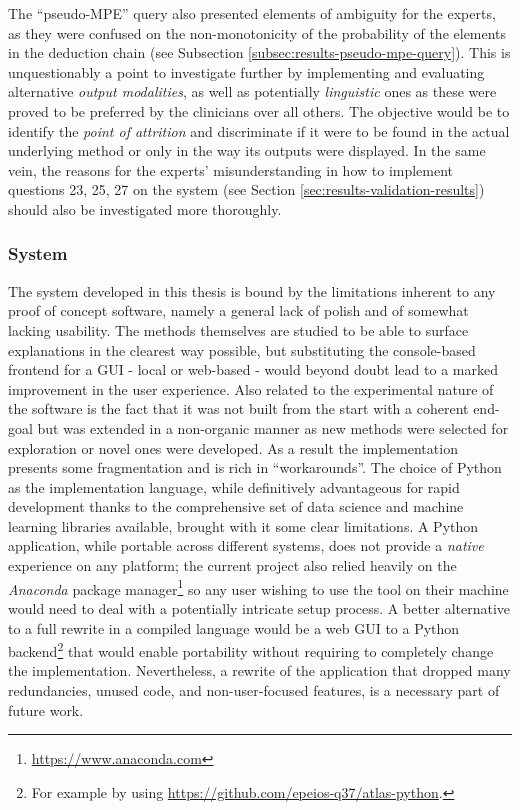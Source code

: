 The \enquote{pseudo-MPE} query also presented elements of ambiguity for the experts, as they were confused on the non-monotonicity of the probability of the elements in the deduction chain (see Subsection \ref{subsec:results-pseudo-mpe-query}).
This is unquestionably a point to investigate further by implementing and evaluating alternative \textit{output modalities}, as well as potentially \textit{linguistic} ones as these were proved to be preferred by the clinicians over all others.
The objective would be to identify the \textit{point of attrition} and discriminate if it were to be found in the actual underlying method or only in the way its outputs were displayed.
In the same vein, the reasons for the experts' misunderstanding in how to implement questions 23, 25, 27 on the system (see Section \ref{sec:results-validation-results}) should also be investigated more thoroughly.

\subsubsection{System}
The system developed in this thesis is bound by the limitations inherent to any proof of concept software, namely a general lack of polish and of somewhat lacking usability.
The methods themselves are studied to be able to surface explanations in the clearest way possible, but substituting the console-based frontend for a GUI - local or web-based - would beyond doubt lead to a marked improvement in the user experience.
Also related to the experimental nature of the software is the fact that it was not built from the start with a coherent end-goal but was extended in a non-organic manner as new methods were selected for exploration or novel ones were developed.
As a result the implementation presents some fragmentation and is rich in \enquote{workarounds}.
The choice of Python as the implementation language, while definitively advantageous for rapid development thanks to the comprehensive set of data science and machine learning libraries available, brought with it some clear limitations.
A Python application, while portable across different systems, does not provide a \textit{native} experience on any platform; the current project also relied heavily on the \textit{Anaconda} package manager\footnote{\url{https://www.anaconda.com}} so any user wishing to use the tool on their machine would need to deal with a potentially intricate setup process.
A better alternative to a full rewrite in a compiled language would be a web GUI to a Python backend\footnote{For example by using \url{https://github.com/epeios-q37/atlas-python}.} that would enable portability without requiring to completely change the implementation.
Nevertheless, a rewrite of the application that dropped many redundancies, unused code, and non-user-focused features, is a necessary part of future work.

